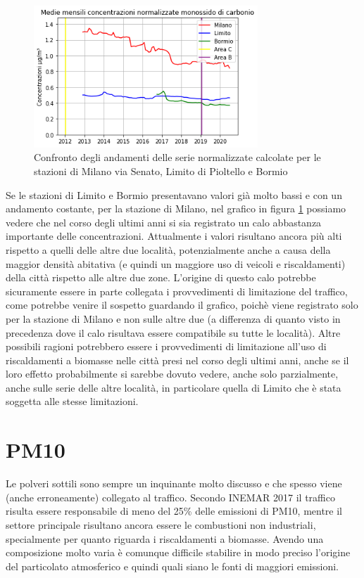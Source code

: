 \documentclass[a4paper]{report}
\begin{document}
\begin{figure}[h]
\centering
\includegraphics[width=0.75\textwidth]{co_traffico}
\caption{Confronto degli andamenti delle serie normalizzate calcolate per le stazioni di Milano via Senato, Limito di Pioltello e Bormio}
\label{fig:co_traffico}
\end{figure}

Se le stazioni di Limito e Bormio presentavano valori già molto bassi e con un andamento costante, per la stazione di Milano, nel grafico in figura \ref{fig:co_traffico} possiamo vedere che nel corso degli ultimi anni si sia registrato un calo abbastanza importante delle concentrazioni. Attualmente i valori risultano ancora più alti rispetto a quelli delle altre due località, potenzialmente anche a causa della maggior densità abitativa (e quindi un maggiore uso di veicoli e riscaldamenti) della città rispetto alle altre due zone.
L'origine di questo calo potrebbe sicuramente essere in parte collegata i provvedimenti di limitazione del traffico, come potrebbe venire il sospetto guardando il grafico, poichè viene registrato solo per la stazione di Milano e non sulle altre due (a differenza di quanto visto in precedenza dove il calo risultava essere compatibile su tutte le località). Altre possibili ragioni potrebbero essere i provvedimenti di limitazione all'uso di riscaldamenti a biomasse nelle città presi nel corso degli ultimi anni, anche se il loro effetto probabilmente si sarebbe dovuto vedere, anche solo parzialmente, anche sulle serie delle altre località, in particolare quella di Limito che è stata soggetta alle stesse limitazioni.

\section{PM10}
Le polveri sottili sono sempre un inquinante molto discusso e che spesso viene (anche erroneamente) collegato al traffico. Secondo INEMAR 2017 \cite{inemar2017} il traffico risulta essere responsabile di meno del 25\% delle emissioni di PM10, mentre il settore principale risultano ancora essere le combustioni non industriali, specialmente per quanto riguarda i riscaldamenti a biomasse. Avendo una composizione molto varia è comunque difficile stabilire in modo preciso l'origine del particolato atmosferico e quindi quali siano le fonti di maggiori emissioni.
\end{document}
